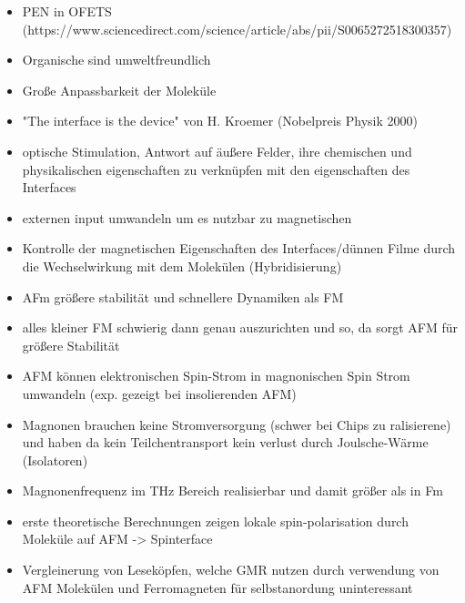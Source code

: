 \begin{itemize}
    \item PEN in OFETS (https://www.sciencedirect.com/science/article/abs/pii/S0065272518300357)
    \item Organische sind umweltfreundlich \cite{Schöll und Schreiber - 2018 - Chapter 24 - Thin Films of Organic Molecules Inte.pdf}
    \item Große Anpassbarkeit der Moleküle \cite{Schöll und Schreiber - 2018 - Chapter 24 - Thin Films of Organic Molecules Inte.pdf}
    \item "The interface is the device" von H. Kroemer (Nobelpreis Physik 2000)
    \item optische Stimulation, Antwort auf äußere Felder, ihre chemischen und physikalischen eigenschaften zu verknüpfen mit den eigenschaften des Interfaces \cite{IF_16}
    \item externen input umwandeln um es nutzbar zu magnetischen
    \item Kontrolle der magnetischen Eigenschaften des Interfaces/dünnen Filme durch die Wechselwirkung mit dem Molekülen (Hybridisierung) \cite{IF_16}
    \item AFm größere stabilität und schnellere Dynamiken als FM \cite{AFM_1}
    \item alles kleiner FM schwierig dann genau auszurichten und so, da sorgt AFM für größere Stabilität 
    \item AFM können elektronischen Spin-Strom in magnonischen Spin Strom umwandeln (exp. gezeigt bei insolierenden AFM) \cite{AFM_1}
    \item Magnonen brauchen keine Stromversorgung (schwer bei Chips zu ralisierene) und haben da kein Teilchentransport kein verlust durch Joulsche-Wärme (Isolatoren) \cite{AFM_3}
    \item Magnonenfrequenz im THz Bereich realisierbar und damit größer als in Fm \cite{AFM_5}
    \item erste theoretische Berechnungen zeigen lokale spin-polarisation durch Moleküle auf AFM \cite{AFM_2} -> Spinterface
    \item Vergleinerung von Leseköpfen, welche GMR nutzen durch verwendung von AFM Molekülen und Ferromagneten \cite{Bagrets - 2012} für selbstanordung uninteressant
\end{itemize}